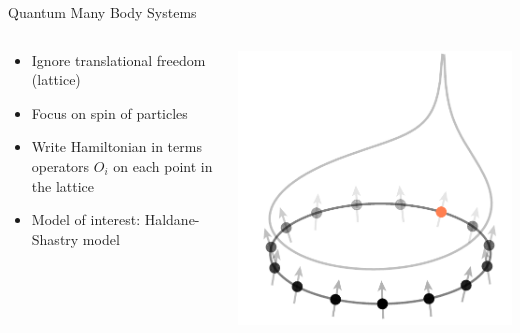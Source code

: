 \documentclass{beamer}
\begin{document}
\begin{frame}{Quantum Many Body Systems}
\begin{columns}
\begin{column}{0.5\textwidth}
\begin{itemize}
\item<+-> Ignore translational freedom (lattice) 
\item<+-> Focus on spin of particles 
\item<+-> Write Hamiltonian in terms operators $ O_i $ on each 
	point in the lattice
\item<+-> Model of interest: Haldane-Shastry model
\end{itemize}
\end{column}
\begin{column}{0.5\textwidth} %
\begin{center}
	\includegraphics[width=1\textwidth]{figs/hs-hamiltonian-cropped-arrows.pdf}
\end{center}
\end{column}
\end{columns}
\end{frame}
\end{document}
